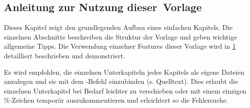 %
\begin{showExamples}%
%
\chapter{Anleitung zur Nutzung \mbox{dieser Vorlage}}%
\label{chap:Examples}
%
%
Dieses Kapitel zeigt den grundlegenden Aufbau eines einfachen Kapitels.
Die einzelnen Abschnitte beschreiben die Struktur der Vorlage und geben wichtige allgemeine Tipps.
Die Verwendung einzelner Features dieser Vorlage wird in \cref{chap:Examples} detailliert beschrieben und demonstriert.

Es wird empfohlen, die einzelnen Unterkapiteln jedes Kapitels als eigene Dateien anzulegen und sie mit dem \verb++-Befehl einzubinden (s. Quelltext).
Dies erlaubt die einzelnen Unterkapitel bei Bedarf leichter zu verschieben oder mit einem einzigen \%-Zeichen temporär auszukommentieren und erleichtert so die Fehlersuche.


\end{showExamples}
